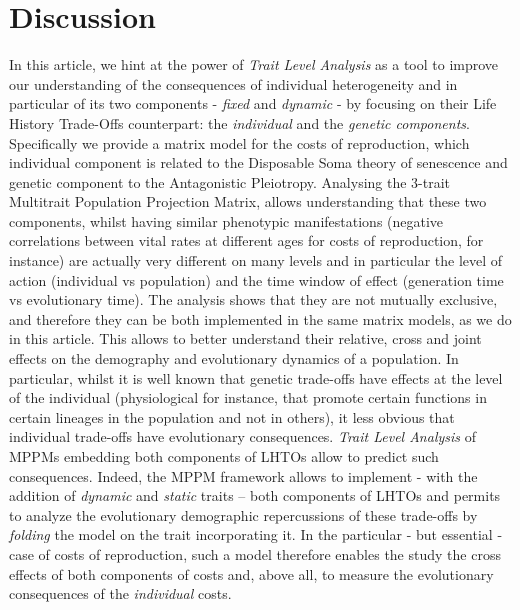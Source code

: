 \documentclass[10pt,a4paper]{article}
\newcommand{\PCoR}{\emph{individual} costs}
\begin{document}
\section{Discussion}
\label{sec:discussion}

In this article, we hint at the power of \emph{Trait Level Analysis} as a tool to improve our understanding of the consequences of individual heterogeneity and in particular of its two components - \emph{fixed} and \emph{dynamic} - by focusing on their Life History Trade-Offs counterpart: the \emph{individual} and the \emph{genetic components}. Specifically we provide a matrix model for the costs of reproduction, which individual component is related to the Disposable Soma theory of senescence and genetic component to the Antagonistic Pleiotropy.
Analysing the 3-trait Multitrait Population Projection Matrix, allows understanding that these two components, whilst having similar phenotypic manifestations (negative correlations between vital rates at different ages for costs of reproduction, for instance) are actually very different on many levels and in particular the level of action (individual vs population) and the time window of effect (generation time vs evolutionary time). The analysis shows that they are not mutually exclusive, and therefore they can be both implemented in the same matrix models, as we do in this article. This allows to better understand their relative, cross and joint effects on the demography and evolutionary dynamics of a population. In particular, whilst it is well known that genetic trade-offs have effects at the level of the individual (physiological for instance, that promote certain functions in certain lineages in the population and not in others), it less obvious that individual trade-offs have evolutionary consequences. \emph{Trait Level Analysis} of MPPMs embedding both components of LHTOs allow to predict such consequences.
Indeed, the MPPM framework allows to implement - with the addition of \emph{dynamic} and \emph{static} traits – both components of LHTOs and permits to analyze the evolutionary demographic repercussions of these trade-offs by \emph{folding} the model on the trait incorporating it. In the particular - but essential - case of costs of reproduction, such a model therefore enables the study the cross effects of both components of costs and, above all, to measure the evolutionary consequences of the \PCoR.\\
\end{document}
